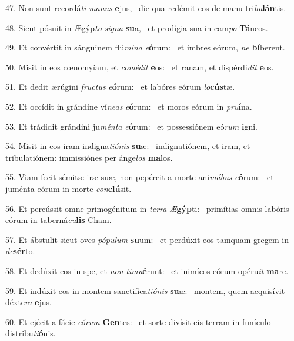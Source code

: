 47. Non sunt recordá\textit{ti} \textit{ma}\textit{nus} \textbf{e}jus, \ast\  die qua redémit eos de manu tri\textit{bu}\textbf{lán}tis.\

48. Sicut pósuit in Ægýp\textit{to} \textit{si}\textit{gna} \textbf{su}a, \ast\  et prodígia sua in cam\textit{po} \textbf{Tá}neos.\

49. Et convértit in sánguinem flú\textit{mi}\textit{na} \textit{e}\textbf{ó}rum: \ast\  et imbres eórum, \textit{ne} \textbf{bí}berent.\

50. Misit in eos cœnomyíam, et \textit{com}\textit{é}\textit{dit} \textbf{e}os: \ast\  et ranam, et dispérdi\textit{dit} \textbf{e}os.\

51. Et dedit ærúgini \textit{fruc}\textit{tus} \textit{e}\textbf{ó}rum: \ast\  et labóres eórum \textit{lo}\textbf{cús}tæ.\

52. Et occídit in grándine ví\textit{ne}\textit{as} \textit{e}\textbf{ó}rum: \ast\  et moros eórum in \textit{pru}\textbf{í}na.\

53. Et trádidit grándini ju\textit{mén}\textit{ta} \textit{e}\textbf{ó}rum: \ast\  et possessiónem eó\textit{rum} \textbf{i}gni.\

54. Misit in eos iram indigna\textit{ti}\textit{ó}\textit{nis} \textbf{su}æ: \ast\  indignatiónem, et iram, et tribulatiónem: immissiónes per ánge\textit{los} \textbf{ma}los.\

55. Viam fecit sémitæ iræ suæ, non pepércit a morte ani\textit{má}\textit{bus} \textit{e}\textbf{ó}rum: \ast\  et juménta eórum in morte \textit{con}\textbf{clú}sit.\

56. Et percússit omne primogénitum in \textit{ter}\textit{ra} \textit{Æ}\textbf{gýp}ti: \ast\  primítias omnis labóris eórum in taberná\textit{cu}\textbf{lis} Cham.\

57. Et ábstulit sicut oves \textit{pó}\textit{pu}\textit{lum} \textbf{su}um: \ast\  et perdúxit eos tamquam gregem in \textit{de}\textbf{sér}to.\

58. Et dedúxit eos in spe, et \textit{non} \textit{ti}\textit{mu}\textbf{é}runt: \ast\  et inimícos eórum opéru\textit{it} \textbf{ma}re.\

59. Et indúxit eos in montem sanctifica\textit{ti}\textit{ó}\textit{nis} \textbf{su}æ: \ast\  montem, quem acquisívit déxte\textit{ra} \textbf{e}jus.\

60. Et ejécit a fácie \textit{e}\textit{ó}\textit{rum} \textbf{Gen}tes: \ast\  et sorte divísit eis terram in funículo distribu\textit{ti}\textbf{ó}nis.\


